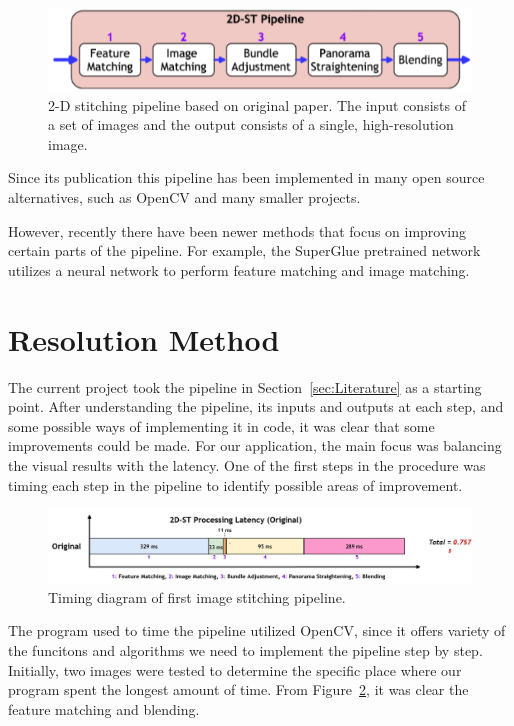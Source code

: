\documentclass[12pt, a4paper]{article}
\begin{document}
\begin{figure}
	\label{fig:PipelineOriginal}
	\centering
	\includegraphics[scale=0.6]{pipeline_orig.png}
	\caption{2-D stitching pipeline based on original paper. The input consists of a set of images and the 
		output consists of a single, high-resolution image.}
\end{figure}

Since its publication this pipeline has been implemented in many open source alternatives, such
as OpenCV and many smaller projects. 

However, recently there have been newer methods that focus on improving certain parts of the pipeline. 
For example, the SuperGlue pretrained network~\cite{Sarlin_2020_CVPR} utilizes a neural network
to perform feature matching and image matching. 

\section{Resolution Method}
\label{sec:ResolutionMethod}
The current project took the pipeline in Section~\ref{sec:Literature} as a starting point. After
understanding the pipeline, its inputs and outputs at each step, and some possible ways of 
implementing it in code, it was clear that some improvements could be made. For our application,
the main focus was balancing the visual results with the latency. One of the first steps in the
procedure was timing each step in the pipeline to identify possible areas of improvement.

\begin{figure}
	\label{fig:PipelineTiming_orig}
	\includegraphics[scale=0.3]{pipelineTiming_orig.png}
	\caption{Timing diagram of first image stitching pipeline.}
\end{figure}

The program used to time the pipeline utilized OpenCV, since it offers variety of the 
funcitons and algorithms we need to implement the pipeline step by step. Initially, two
images were tested to determine the specific place where our program spent the longest 
amount of time. From Figure~\ref{fig:PipelineTiming_orig}, it was clear the 
feature matching and blending.
\end{document}
